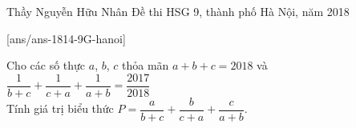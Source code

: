 \begin{name}
{Thầy Nguyễn Hữu Nhân}
{Đề thi HSG 9, thành phố Hà Nội, năm 2018}
\end{name}
\setcounter{ex}{0}
[ans/ans-1814-9G-hanoi]
\begin{ex}%
	Cho các số thực $a$, $b$, $c$ thỏa mãn $a+b+c=2018$ và $\dfrac{1}{b+c}+\dfrac{1}{c+a}+\dfrac{1}{a+b}=\dfrac{2017}{2018}$\\
	Tính giá trị biểu thức $P=\dfrac{a}{b+c}+\dfrac{b}{c+a}+\dfrac{c}{a+b}.$
\end{ex}

